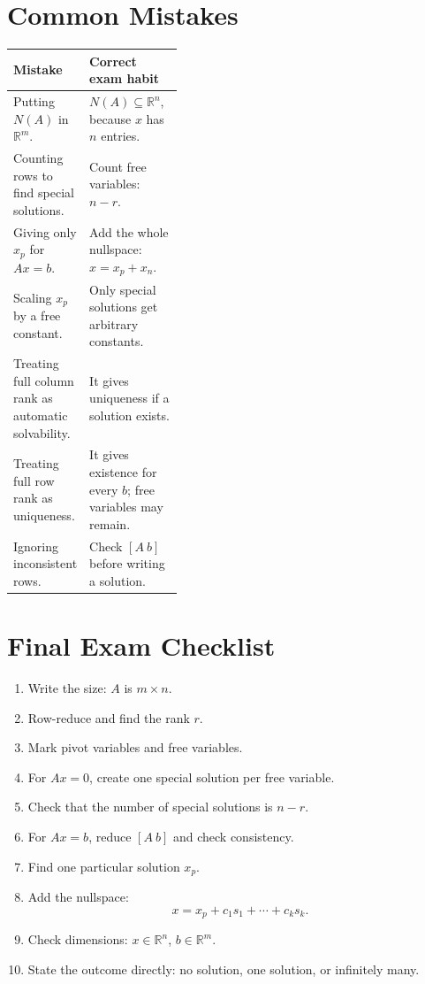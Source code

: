 \documentclass[10pt]{article}
\begin{document}
\section{Common Mistakes}

\begin{center}
\small
\begin{tabularx}{\linewidth}{@{}L{0.38\linewidth}Y@{}}
\toprule
Mistake & Correct exam habit \\
\midrule
Putting \(N(A)\) in \(\mathbb{R}^m\). & \(N(A)\subseteq\mathbb{R}^n\), because \(x\) has \(n\) entries. \\
Counting rows to find special solutions. & Count free variables: \(n-r\). \\
Giving only \(x_p\) for \(Ax=b\). & Add the whole nullspace: \(x=x_p+x_n\). \\
Scaling \(x_p\) by a free constant. & Only special solutions get arbitrary constants. \\
Treating full column rank as automatic solvability. & It gives uniqueness if a solution exists. \\
Treating full row rank as uniqueness. & It gives existence for every \(b\); free variables may remain. \\
Ignoring inconsistent rows. & Check \([A\ b]\) before writing a solution. \\
\bottomrule
\end{tabularx}
\end{center}

\section{Final Exam Checklist}

\begin{enumerate}
  \item Write the size: \(A\) is \(m\times n\).
  \item Row-reduce and find the rank \(r\).
  \item Mark pivot variables and free variables.
  \item For \(Ax=0\), create one special solution per free variable.
  \item Check that the number of special solutions is \(n-r\).
  \item For \(Ax=b\), reduce \([A\ b]\) and check consistency.
  \item Find one particular solution \(x_p\).
  \item Add the nullspace:
  \[
  x=x_p+c_1s_1+\cdots+c_ks_k.
  \]
  \item Check dimensions: \(x\in\mathbb{R}^n\), \(b\in\mathbb{R}^m\).
  \item State the outcome directly: no solution, one solution, or infinitely many.
\end{enumerate}
\end{document}
